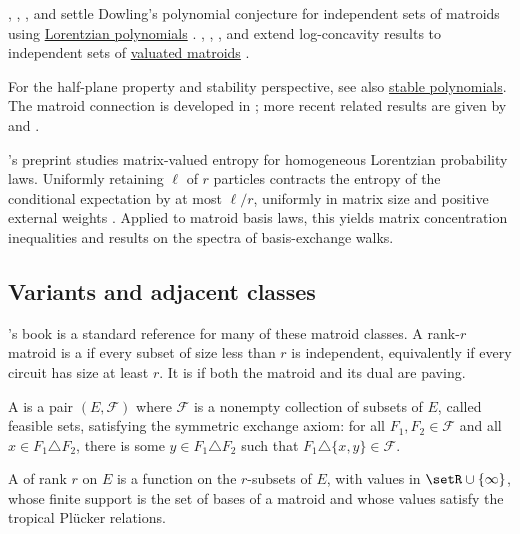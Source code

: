 , , , and 
settle Dowling's polynomial conjecture for independent sets of matroids using
\hyperref[lorentzianPolynomial]{Lorentzian polynomials}
\cite{CaoChenLiWu2026x}.  ,
, , and 
extend log-concavity results to independent sets of
\hyperref[valuatedMatroid]{valuated matroids}
\cite{GiansiracusaRinconSchleisUlirsch2024x}.

For the half-plane property and stability perspective, see also
\hyperref[stablePolynomial]{stable polynomials}.  The matroid connection is
developed in \cite{Branden2007,ChoeWagner2006}; more recent related results
are given by  and 
\cite{KummerSawall2025}.

's preprint studies matrix-valued entropy for homogeneous
Lorentzian probability laws. Uniformly retaining $\ell$ of $r$ particles
contracts the entropy of the conditional expectation by at most $\ell/r$,
uniformly in matrix size and positive external weights
\cite[Thm.~1.1]{Ercan2026Entropy}.
Applied to matroid basis laws, this yields matrix concentration inequalities
and results on the spectra of basis-exchange walks.

\subsection[matroidVariantsAdjacentClasses]{Variants and adjacent classes}

's book \cite{Oxley2011} is a standard reference for
many of these matroid classes.  A rank-$r$ matroid is a
\label{pavingMatroid} if every subset of size less than
$r$ is independent, equivalently if every circuit has size at least $r$.  It
is \label{sparsePavingMatroid} if both the matroid and
its dual are paving.

\begin{definition}\label{deltaMatroid}
A  is a pair $(E,\mathcal{F})$ where
$\mathcal{F}$ is a nonempty collection of subsets of $E$, called feasible
sets, satisfying the symmetric exchange axiom: for all
$F_1,F_2\in\mathcal{F}$ and all $x\in F_1\triangle F_2$, there is some
$y\in F_1\triangle F_2$ such that $F_1\triangle\{x,y\}\in\mathcal{F}$.
\end{definition}

\begin{definition}\label{valuatedMatroid}
A  of rank $r$ on $E$ is a function on the
$r$-subsets of $E$, with values in $\setR\cup\{\infty\}$, whose finite support
is the set of bases of a matroid and whose values satisfy the tropical
Pl{\"u}cker relations.
\end{definition}


